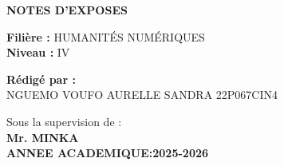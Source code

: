 \documentclass[12pt,a4paper]{article}
\begin{document}
\begin{titlepage}
		
		\vspace{1cm}
		
		\begin{center}
			
			\colorbox{blue!70}{\parbox{1\textwidth}{\centering
					\textbf{\color{white}{SEC 4031 \quad INTRODUCTION AUX TECHNIQUES D'INVESTTGATION NUMERIQUE}}
			}}
			
			\vspace{0.5cm}
			
			\colorbox{gray!30}{\parbox{0.9\textwidth}{\centering
					\textbf{NOTES D'EXPOSES}
			}}
		\end{center}
		
		\vspace{1cm}
		
		\noindent
		\textbf{Filière :} HUMANITÉS NUMÉRIQUES \\[0.5cm]
		\textbf{Niveau :} IV
		
		\vspace{1cm}
		
		\noindent
		\textbf{Rédigé par :} \\[0.5cm]
		\quad          NGUEMO VOUFO AURELLE SANDRA \hfill 22P067\hfill CIN4
		
		\vspace{2cm}
		
		\begin{center}
			Sous la supervision de : \\
			\textbf{\hfill Mr. MINKA}\\[1.5 cm]
			\textbf{ANNEE ACADEMIQUE:2025-2026}
		\end{center}
		\end{titlepage}
\end{document}
